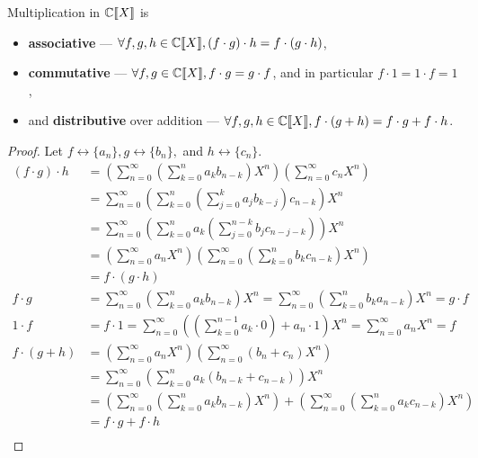 \documentclass[a4paper, 12pt]{report}
\begin{document}
\begin{prop}\label{prop:gf-mult-properties}
Multiplication in $\mathbb{C}\llbracket X \rrbracket$ is \begin{itemize}
\item \textbf{associative} --- $\forall f, g, h \in \mathbb{C}\llbracket X \rrbracket, (f \cdot g) \cdot h = f \cdot (g \cdot h)$,
\item \textbf{commutative} --- $\forall f, g \in \mathbb{C}\llbracket X \rrbracket, f \cdot g = g \cdot f$, and in particular $f \cdot 1 = 1 \cdot f = 1$,
\item and \textbf{distributive} over addition --- $\forall f, g, h \in \mathbb{C}\llbracket X \rrbracket, f \cdot (g + h) = f \cdot g + f \cdot h$.
\end{itemize}
\end{prop}
\begin{proof}
Let $f \longleftrightarrow \{a_n\}, g \longleftrightarrow \{b_n\},$ and $h \longleftrightarrow \{c_n\}$.
\begin{align*}
(f \cdot g) \cdot h 
&= \left(\sum_{n = 0}^\infty \left(\sum_{k = 0}^n a_k b_{n - k}\right) X^n\right) \left(\sum_{n = 0}^\infty c_n X^n\right)\\
&= \sum_{n = 0}^\infty \left(\sum_{k = 0}^n \left(\sum_{j = 0}^k a_j b_{k - j} \right) c_{n - k}\right) X^n\\
&= \sum_{n = 0}^\infty \left(\sum_{k = 0}^n a_k \left(\sum_{j = 0}^{n - k} b_{j} c_{n - j - k}\right)\right) X^n\\
&= \left(\sum_{n = 0}^\infty a_n X^n\right) \left(\sum_{n = 0}^\infty \left(\sum_{k = 0}^n b_k c_{n - k}\right) X^n \right)\\
&= f \cdot (g \cdot h)\\
f \cdot g 
&= \sum_{n = 0}^\infty \left(\sum_{k = 0}^n a_k b_{n - k} \right) X^n
= \sum_{n = 0}^\infty \left(\sum_{k = 0}^n b_k a_{n - k} \right) X^n
= g \cdot f\\
1 \cdot f
&= f \cdot 1
= \sum_{n = 0}^\infty \left(\left(\sum_{k = 0}^{n - 1} a_k \cdot 0\right) + a_n \cdot 1\right) X^n
= \sum_{n = 0}^\infty a_n X^n
= f\\
f \cdot (g + h)
&= \left(\sum_{n = 0}^\infty a_n X^n\right)\left(\sum_{n = 0}^\infty (b_n + c_n) X^n\right)\\
&= \sum_{n = 0}^\infty \left(\sum_{k = 0}^n a_k (b_{n - k} + c_{n - k})\right) X^n\\
&=\left(\sum_{n = 0}^\infty \left(\sum_{k = 0}^n a_k b_{n - k}\right) X^n\right) 
+ \left(\sum_{n = 0}^\infty \left(\sum_{k = 0}^n a_k c_{n - k}\right) X^n\right)\\
&= f \cdot g + f \cdot h\\
\end{align*}
\end{proof}
\end{document}
